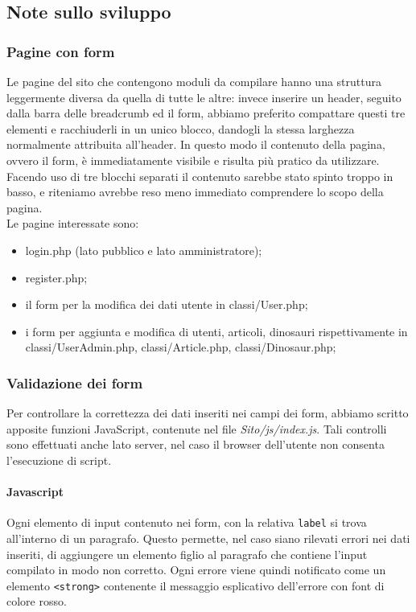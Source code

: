 \documentclass[12pt]{article}
\newcommand{\code}[1]{\texttt{#1}}
\begin{document}
	\subsection{Note sullo sviluppo}
	\subsubsection{Pagine con form}
	Le pagine del sito che contengono moduli da compilare hanno una struttura leggermente diversa da quella di tutte le altre: invece inserire un header, seguito dalla barra delle breadcrumb ed il form, abbiamo preferito compattare questi tre elementi e racchiuderli in un unico blocco, dandogli la stessa larghezza normalmente attribuita all'header. 
	In questo modo il contenuto della pagina, ovvero il form, è immediatamente visibile e risulta più pratico da utilizzare.\\Facendo uso di tre blocchi separati il contenuto sarebbe stato spinto troppo in basso, e riteniamo avrebbe reso meno immediato comprendere lo scopo della pagina.\\
	Le pagine interessate sono:
	\begin{itemize}
		\item login.php (lato pubblico e lato amministratore);
		\item register.php;
		\item il form per la modifica dei dati utente in classi/User.php; 
		\item i form per aggiunta e modifica di utenti, articoli, dinosauri rispettivamente in classi/UserAdmin.php, classi/Article.php, classi/Dinosaur.php;
	\end{itemize}

	\subsubsection{Validazione dei form}
	Per controllare la correttezza dei dati inseriti nei campi dei form, abbiamo scritto apposite funzioni JavaScript, contenute nel file \textit{Sito/js/index.js}. Tali controlli sono effettuati anche lato server, nel caso il browser dell'utente non consenta l'esecuzione di script.
	\paragraph{Javascript}
	Ogni elemento di input contenuto nei form, con la relativa \code{label} si trova all'interno di un paragrafo. Questo permette, nel caso siano rilevati errori nei dati inseriti, di aggiungere un elemento figlio al paragrafo che contiene l'input compilato in modo non corretto.
	Ogni errore viene quindi notificato come un elemento \code{<strong>} contenente il messaggio esplicativo dell'errore con font di colore rosso.\\
	
\end{document}

